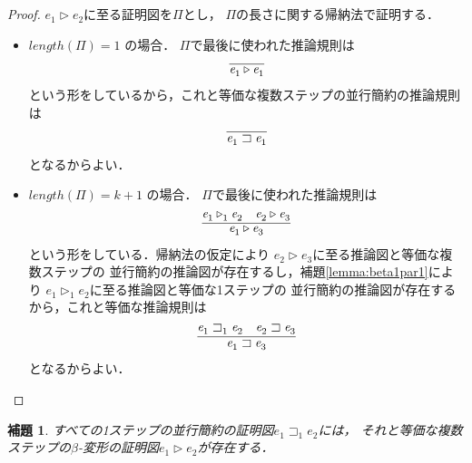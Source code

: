 \documentclass{ltjsbook}%
\newtheorem{lemma}{補題}[section]%
\newcommand\lemmaname{補題}%
\begin{document}
\begin{proof}
  $\mathit{e}_1^{}\triangleright\mathit{e}_2^{}$に至る証明図を$\Pi$とし，%
  $\Pi$の長さに関する帰納法で証明する．%
  \begin{itemize}%
  \item $length(\Pi)=1$ の場合．%
    $\Pi$で最後に使われた推論規則は%
    \begin{equation}%
      \infer{%
        \mathit{e}_1^{}\triangleright\mathit{e}_1^{}%
      }{%
      }%
    \end{equation}%
    という形をしているから，これと等価な複数ステップの並行簡約の推論規則は%
    \begin{equation}%
      \infer{%
        \mathit{e}_1^{}\sqsupset\mathit{e}_1^{}%
      }{%
      }%
    \end{equation}%
    となるからよい．%
  \item $length(\Pi)=k + 1$ の場合．%
    $\Pi$で最後に使われた推論規則は%
    \begin{equation}%
      \infer{%
        \mathit{e}_1^{}\triangleright\mathit{e}_3^{}%
      }{%
        \mathit{e}_1^{}\triangleright_1^{}\mathit{e}_2^{}%
      &%
        \mathit{e}_2^{}\triangleright\mathit{e}_3^{}%
      }%
    \end{equation}%
    という形をしている．帰納法の仮定により%
    $\mathit{e}_2^{}\triangleright\mathit{e}_3^{}$に至る推論図と等価な複数ステップの%
    並行簡約の推論図が存在するし，\lemmaname\ref{lemma:beta1par1}により%
    $\mathit{e}_1^{}\triangleright_1^{}\mathit{e}_2^{}$に至る推論図と等価な1ステップの%
    並行簡約の推論図が存在するから，これと等価な推論規則は%
    \begin{equation}%
      \infer{%
        \mathit{e}_1^{}\sqsupset\mathit{e}_3^{}%
      }{%
        \mathit{e}_1^{}\sqsupset_1^{}\mathit{e}_2^{}%
      &%
        \mathit{e}_2^{}\sqsupset\mathit{e}_3^{}%
      }%
    \end{equation}%
    となるからよい．%
  \end{itemize}%
\end{proof}%
\begin{lemma}%
  \label{lemma:par1beta}%
  すべての1ステップの並行簡約の証明図$\mathit{e}_1^{}\sqsupset_1^{}\mathit{e}_2^{}$には，%
  それと等価な複数ステップの$\beta$-変形の証明図$\mathit{e}_1^{}\triangleright\mathit{e}_2^{}$が存在する．%
\end{lemma}%
\end{document}
